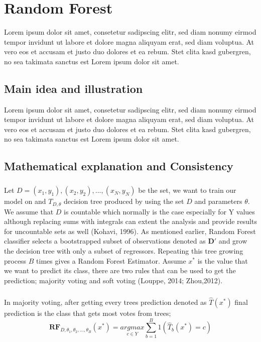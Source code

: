 \chapter{Random Forest}
Lorem ipsum dolor sit amet, consetetur sadipscing elitr,
sed diam nonumy eirmod tempor invidunt ut labore et dolore magna aliquyam erat, sed diam voluptua.
At vero eos et accusam et justo duo dolores et ea rebum. Stet clita kasd gubergren,
no sea takimata sanctus est Lorem ipsum dolor sit amet.

\section{Main idea and illustration}
Lorem ipsum dolor sit amet, consetetur sadipscing elitr,
sed diam nonumy eirmod tempor invidunt ut labore et dolore magna aliquyam erat, sed diam voluptua.
At vero eos et accusam et justo duo dolores et ea rebum. Stet clita kasd gubergren,
no sea takimata sanctus est Lorem ipsum dolor sit amet.

\section{Mathematical explanation and Consistency}
\paragraph{}
Let $D = {(x_{1},y_{1}), (x_{2}, y_{2}), ... , (x_{N}, y_{N})}$ be the set, we want to train our model on and $T_{D, \theta}$ decision tree produced by using the set $D$ and parameters $\theta$. We assume that $D$ is countable which normally is the case especially for Y values although replacing sums with integrals can extent the analysis and provide results for uncountable sets as well (Kohavi, 1996). As mentioned earlier, Random Forest classifier selects a bootstrapped subset of observations denoted as $\boldsymbol{D'}$ and grow the decision tree with only a subset of regressors. Repeating this tree growing process $B$ times gives a Random Forest Estimator. Assume $x^*$ is the value that we want to predict its class, there are two rules that can be used to get the prediction; majority voting and soft voting (Louppe, 2014; Zhou,2012).
\paragraph{}
In majority voting, after getting every trees prediction denoted as $\hat{T}(x^*)$ final prediction is the class that gets most votes from trees;
\begin{equation}
\boldsymbol{RF}_{D, \theta_{1}, \theta_{2}, ..., \theta_{B}} (x^*) =
	\underset{c \in Y}{argmax} \sum_{b = 1}^{B}{1(\hat{T}_{b}(x^*) = c)}
\end{equation}


